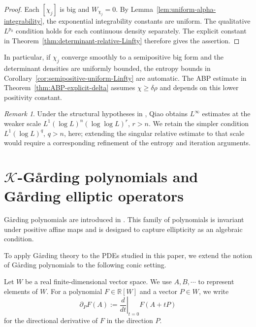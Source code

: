 \documentclass[oneside,english,letterpaper]{amsart}
\numberwithin{equation}{section}
\theoremstyle{plain}
\theoremstyle{definition}
\theoremstyle{remark}
\newtheorem{rem}[thm]{Remark}
\def\pdv{\partial}
\newcommand{\gar}{\ifmmode\mathrm{G\mathring{a}rding}\else G{\aa}rding\fi}
\begin{document}
\begin{proof}
	Each $[\chi_j]$ is big and $W_{\chi_j}=0$. By
	Lemma~\ref{lem:uniform-alpha-integrability}, the exponential
	integrability constants are uniform. The qualitative
	$L^{p_0}$ condition holds for each continuous density separately.
	The explicit constant in
	Theorem~\ref{thm:determinant-relative-Linfty} therefore gives the
	assertion.
\end{proof}

In particular, if $\chi_j$ converge smoothly to a semipositive big
form and the determinant densities are uniformly bounded, the
entropy bounds in Corollary~\ref{cor:semipositive-uniform-Linfty}
are automatic. The ABP estimate in Theorem~\ref{thm:ABP-explicit-delta} assumes
$\chi\geq\delta\rho$ and depends on this lower positivity constant.

\begin{rem}
	\label{rem:qiao-entropy}
	Under the structural hypotheses in \cite{MR4913058}, Qiao obtains
	$L^\infty$ estimates at the weaker scale
	$L^1(\log L)^n(\log\log L)^r$, $r>n$.
	We retain the simpler condition $L^1(\log L)^q$, $q>n$, here;
	extending the singular relative estimate to that scale would
	require a corresponding refinement of the entropy and iteration
	arguments.
\end{rem}

\section{\texorpdfstring{${\mathcal K}$}{K}-\gar{} polynomials and \gar{} elliptic operators}
\label{sec:K-Garding}

\gar{} polynomials are introduced in \cite{Fang-MaGard}. This family of polynomials is invariant under positive affine maps and is designed to capture ellipticity as an algebraic condition.

To apply G{\aa}rding theory to the PDEs studied in this paper, we
extend the notion of \gar{} polynomials to the following conic
setting.

Let \(W\) be a real finite-dimensional vector space. We use $A,B,\cdots$ to represent elements of $W$. For a polynomial \(F\in\mathbb{R}[W]\) and a vector \(P\in W\), we write
\[
\pdv_P F(A)
:=
\left.\frac{d}{dt}\right|_{t=0}F(A+tP)
\]
for the directional derivative of \(F\) in the direction \(P\).
\end{document}
